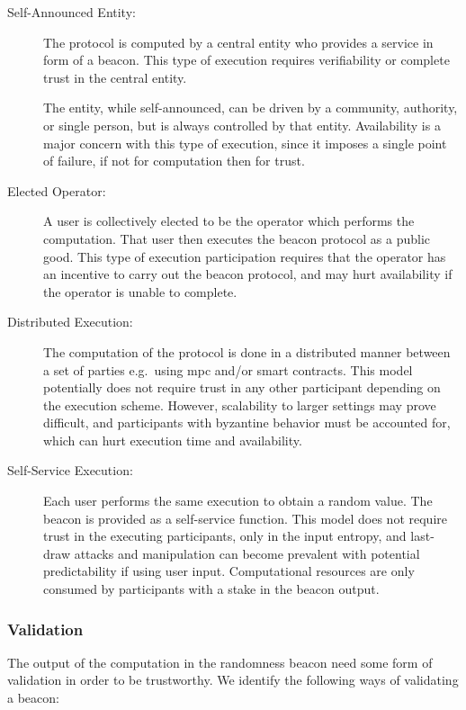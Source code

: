 \begin{description}
    \item[Self-Announced Entity:]
        The protocol is computed by a central entity who provides a service in form of a beacon.
        This type of execution requires verifiability or complete trust in the central entity.

        The entity, while self-announced, can be driven by a community, authority, or single person, but is always controlled by that entity.
        Availability is a major concern with this type of execution, since it imposes a single point of failure, if not for computation then for trust.

    \item[Elected Operator:]
        A user is collectively elected to be the operator which performs the computation.
        That user then executes the beacon protocol as a public good.
        This type of execution participation requires that the operator has an incentive to carry out the beacon protocol, and may hurt availability if the operator is unable to complete.

    \item[Distributed Execution:]
        The computation of the protocol is done in a distributed manner between a set of parties e.g.\ using \gls{mpc} and/or smart contracts.
        This model potentially does not require trust in any other participant depending on the execution scheme.
        However, scalability to larger settings may prove difficult, and participants with byzantine behavior must be accounted for, which can hurt execution time and availability.

    \item[Self-Service Execution:]
        Each user performs the same execution to obtain a random value. The beacon is provided as a self-service function.
        This model does not require trust in the executing participants, only in the input entropy, and last-draw attacks and manipulation can become prevalent with potential predictability if using user input.
        Computational resources are only consumed by participants with a stake in the beacon output.
\end{description}

\subsubsection{Validation}
The output of the computation in the randomness beacon need some form of validation in order to be trustworthy.
We identify the following ways of validating a beacon:

